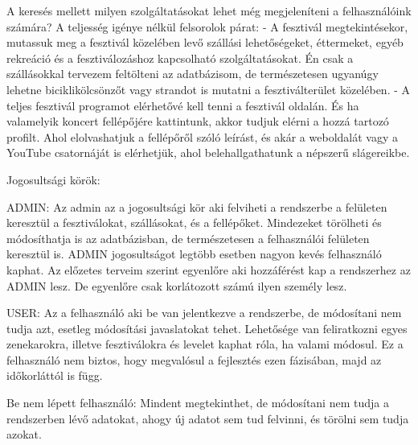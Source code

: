 A keresés mellett milyen szolgáltatásokat lehet még megjeleníteni a felhasználóink számára?
A teljesség igénye nélkül felsorolok párat:
- A fesztivál megtekintésekor, mutassuk meg a fesztivál közelében levő szállási lehetőségeket, éttermeket, egyéb rekreáció és a fesztiválozáshoz kapcsolható szolgáltatásokat. Én csak a szállásokkal tervezem feltölteni az adatbázisom, de természetesen ugyanúgy lehetne biciklikölcsönzőt vagy strandot is mutatni a fesztiválterület közelében. 
- A teljes fesztivál programot elérhetővé kell tenni a fesztivál oldalán. És ha valamelyik koncert fellépőjére kattintunk, akkor tudjuk elérni a hozzá tartozó profilt. Ahol elolvashatjuk a fellépőről szóló leírást, és akár a weboldalát vagy a YouTube csatornáját is elérhetjük, ahol belehallgathatunk a népszerű slágereikbe.


Jogosultsági körök:

ADMIN: Az admin az a jogosultsági kör aki felviheti a rendszerbe a felületen keresztül a fesztiválokat, szállásokat, és a fellépőket. Mindezeket törölheti és módosíthatja is az adatbázisban, de természetesen a felhasználói felületen keresztül is. ADMIN jogosultságot legtöbb esetben nagyon kevés felhasználó kaphat. Az előzetes terveim szerint egyenlőre aki hozzáférést kap a rendszerhez az ADMIN lesz. De egyenlőre csak korlátozott számú ilyen személy lesz.

USER: Az a felhasználó aki be van jelentkezve a rendszerbe, de módosítani nem tudja azt, esetleg módosítási javaslatokat tehet. Lehetősége van feliratkozni egyes zenekarokra, illetve fesztiválokra és levelet kaphat róla, ha valami módosul. Ez a felhasználó nem biztos, hogy megvalósul a fejlesztés ezen fázisában, majd az időkorláttól is függ.

Be nem lépett felhasználó: Mindent megtekinthet, de módosítani nem tudja a rendszerben lévő adatokat, ahogy új adatot sem tud felvinni, és törölni sem tudja azokat.